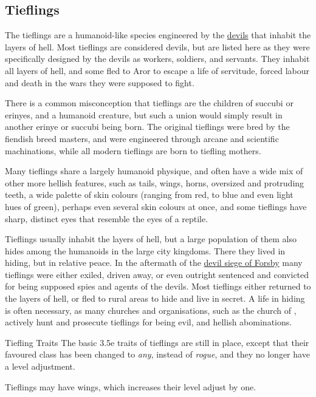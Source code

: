 \subsection{Tieflings}
\label{sec:Tieflings}

The tieflings are a humanoid-like species engineered by the
\hyperref[sec:Devils]{devils} that inhabit the layers of hell. Most tieflings
are considered devils, but are listed here as they were specifically designed
by the devils as workers, soldiers, and servants. They inhabit all layers of
hell, and some fled to Aror to escape a life of servitude, forced labour and
death in the wars they were supposed to fight.

There is a common misconception that tieflings are the children of succubi or
erinyes, and a humanoid creature, but such a union would simply result in
another erinye or succubi being born. The original tieflings were bred by the
fiendish breed masters, and were engineered through arcane and scientific
machinations, while all modern tieflings are born to tiefling mothers.

Many tieflings share a largely humanoid physique, and often have a wide mix of
other more hellish features, such as tails, wings, horns, oversized and
protruding teeth, a wide palette of skin colours (ranging from red, to blue
and even light hues of green), perhaps even several skin colours at once, and
some tieflings have sharp, distinct eyes that resemble the eyes of a reptile.

Tieflings usually inhabit the layers of hell, but a large population of them
also hides among the humanoids in the large city kingdoms. There they lived
in hiding, but in relative peace. In the aftermath of the \hyperref[sec:Devil
  Siege]{devil siege of Forsby} many tieflings were either exiled, driven
away, or even outright sentenced and convicted for being supposed spies and
agents of the devils. Most tieflings either returned to the layers of hell, or
fled to rural areas to hide and live in secret. A life in hiding is often
necessary, as many churches and organisations, such as the church of
, actively hunt and prosecute tieflings for being evil, and
hellish abominations.

\begin{35e}{Tiefling Traits}
  The basic 3.5e traits of tieflings are still in place, except that their
  favoured class has been changed to \emph{any}, instead of \emph{rogue},
  and they no longer have a level adjustment.

  Tieflings may have wings, which increases their level adjust by one.
\end{35e}
